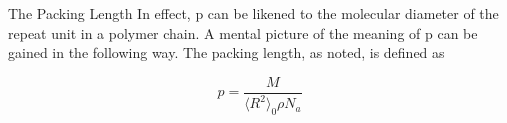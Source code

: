 \documentclass[a4paper,11pt]{ltjsarticle}
\begin{document}
The Packing Length 
In effect, p can be likened to the molecular diameter of the repeat unit in a polymer chain. A mental picture of the meaning of p can be gained in the following way. The packing length, as noted, is defined as 

\begin{equation}
    p=\dfrac{M}{\langle R^2 \rangle_0 \rho N_a}
\end{equation}





\end{document}
